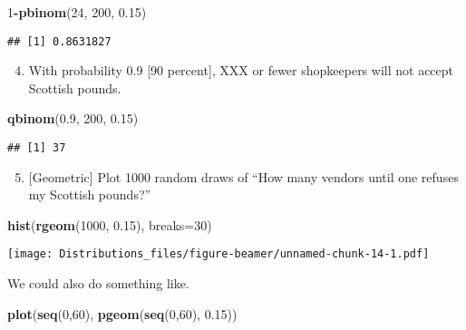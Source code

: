 \documentclass[ignorenonframetext,]{beamer}
\newenvironment{Shaded}{\begin{snugshade}}{\end{snugshade}}
\newcommand{\DataTypeTok}[1]{\textcolor[rgb]{0.13,0.29,0.53}{#1}}
\newcommand{\DecValTok}[1]{\textcolor[rgb]{0.00,0.00,0.81}{#1}}
\newcommand{\FloatTok}[1]{\textcolor[rgb]{0.00,0.00,0.81}{#1}}
\newcommand{\KeywordTok}[1]{\textcolor[rgb]{0.13,0.29,0.53}{\textbf{#1}}}
\newcommand{\NormalTok}[1]{#1}
\newcommand{\OperatorTok}[1]{\textcolor[rgb]{0.81,0.36,0.00}{\textbf{#1}}}
\providecommand{\tightlist}{%
  \setlength{\itemsep}{0pt}\setlength{\parskip}{0pt}}
\begin{document}
\begin{Shaded}
\begin{Highlighting}[]
\DecValTok{1}\OperatorTok{-}\KeywordTok{pbinom}\NormalTok{(}\DecValTok{24}\NormalTok{, }\DecValTok{200}\NormalTok{, }\FloatTok{0.15}\NormalTok{)}
\end{Highlighting}
\end{Shaded}

\begin{verbatim}
## [1] 0.8631827
\end{verbatim}

\begin{enumerate}[<+->]
\setcounter{enumi}{3}
\tightlist
\item
  With probability 0.9 {[}90 percent{]}, XXX or fewer shopkeepers will
  not accept Scottish pounds.
\end{enumerate}

\begin{Shaded}
\begin{Highlighting}[]
\KeywordTok{qbinom}\NormalTok{(}\FloatTok{0.9}\NormalTok{, }\DecValTok{200}\NormalTok{, }\FloatTok{0.15}\NormalTok{)}
\end{Highlighting}
\end{Shaded}

\begin{verbatim}
## [1] 37
\end{verbatim}

\begin{enumerate}[<+->]
\setcounter{enumi}{4}
\tightlist
\item
  {[}Geometric{]} Plot 1000 random draws of ``How many vendors until one
  refuses my Scottish pounds?''
\end{enumerate}

\begin{Shaded}
\begin{Highlighting}[]
\KeywordTok{hist}\NormalTok{(}\KeywordTok{rgeom}\NormalTok{(}\DecValTok{1000}\NormalTok{, }\FloatTok{0.15}\NormalTok{), }\DataTypeTok{breaks=}\DecValTok{30}\NormalTok{)}
\end{Highlighting}
\end{Shaded}

\texttt{[image: Distributions\_files/figure-beamer/unnamed-chunk-14-1.pdf]}

We could also do something like.

\begin{Shaded}
\begin{Highlighting}[]
\KeywordTok{plot}\NormalTok{(}\KeywordTok{seq}\NormalTok{(}\DecValTok{0}\NormalTok{,}\DecValTok{60}\NormalTok{), }\KeywordTok{pgeom}\NormalTok{(}\KeywordTok{seq}\NormalTok{(}\DecValTok{0}\NormalTok{,}\DecValTok{60}\NormalTok{), }\FloatTok{0.15}\NormalTok{))}
\end{Highlighting}
\end{Shaded}
\end{document}
